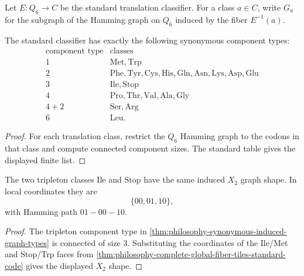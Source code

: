 \begin{definition}
\label{def:philosophy-synonymous-induced-graph}
Let $E:Q_{6}\to C$ be the standard translation classifier. For a class
$a\in C$, write $G_{a}$ for the subgraph of the Hamming graph on $Q_{6}$
induced by the fiber $E^{-1}(a)$.
\end{definition}

\begin{theorem}
\label{thm:philosophy-synonymous-induced-graph-types}
The standard classifier has exactly the following synonymous component
types:
$$
\begin{array}{c|l}
  \text{component type} & \text{classes}\\
\hline
  1 & \mathrm{Met},\mathrm{Trp}\\
  2 & \mathrm{Phe},\mathrm{Tyr},\mathrm{Cys},\mathrm{His},
      \mathrm{Gln},\mathrm{Asn},\mathrm{Lys},\mathrm{Asp},\mathrm{Glu}\\
  3 & \mathrm{Ile},\mathrm{Stop}\\
  4 & \mathrm{Pro},\mathrm{Thr},\mathrm{Val},\mathrm{Ala},\mathrm{Gly}\\
  4+2 & \mathrm{Ser},\mathrm{Arg}\\
  6 & \mathrm{Leu}.
\end{array}
$$
\end{theorem}
\begin{proof}
For each translation class, restrict the $Q_{6}$ Hamming graph to the
codons in that class and compute connected component sizes. The
standard table gives the displayed finite list.
\end{proof}

\begin{corollary}
\label{cor:philosophy-dual-tripleton-shape}
The two tripleton classes $\mathrm{Ile}$ and $\mathrm{Stop}$ have the
same induced $X_{2}$ graph shape. In local coordinates they are
$$
  \{00,01,10\},
$$
with Hamming path $01-00-10$.
\end{corollary}
\begin{proof}
The tripleton component type in
\autoref{thm:philosophy-synonymous-induced-graph-types} is connected of
size $3$. Substituting the coordinates of the Ile/Met and Stop/Trp
faces from
\autoref{thm:philosophy-complete-global-fiber-tiles-standard-code} gives
the displayed $X_{2}$ shape.
\end{proof}

